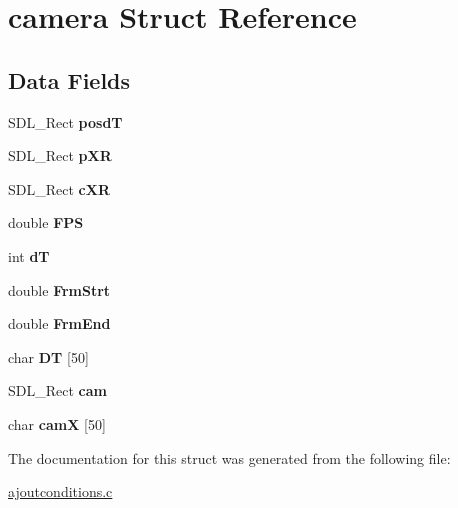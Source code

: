 \hypertarget{structcamera}{}\section{camera Struct Reference}
\label{structcamera}
\subsection*{Data Fields}
\begin{DoxyCompactItemize}
\item 
S\+D\+L\+\_\+\+Rect {\bfseries posdT}\hypertarget{structcamera_a009926b7b18bd483f27645f463f7463c}{}\label{structcamera_a009926b7b18bd483f27645f463f7463c}

\item 
S\+D\+L\+\_\+\+Rect {\bfseries p\+XR}\hypertarget{structcamera_ae3a1e769fbfe10ea4d1453c16c42e3ce}{}\label{structcamera_ae3a1e769fbfe10ea4d1453c16c42e3ce}

\item 
S\+D\+L\+\_\+\+Rect {\bfseries c\+XR}\hypertarget{structcamera_a134fe062710ef10c8aa37628c9fbe1f5}{}\label{structcamera_a134fe062710ef10c8aa37628c9fbe1f5}

\item 
double {\bfseries F\+PS}\hypertarget{structcamera_afea4555da34258956a5c18694a620d68}{}\label{structcamera_afea4555da34258956a5c18694a620d68}

\item 
int {\bfseries dT}\hypertarget{structcamera_a8b299ba58c00e93ad02d6bdbad871d9f}{}\label{structcamera_a8b299ba58c00e93ad02d6bdbad871d9f}

\item 
double {\bfseries Frm\+Strt}\hypertarget{structcamera_a62f48b9a8e4a2adb44fd95a80b4ff5d7}{}\label{structcamera_a62f48b9a8e4a2adb44fd95a80b4ff5d7}

\item 
double {\bfseries Frm\+End}\hypertarget{structcamera_a0689e8f79e69ab9bc91c1be2e4a66ea3}{}\label{structcamera_a0689e8f79e69ab9bc91c1be2e4a66ea3}

\item 
char {\bfseries DT} \mbox{[}50\mbox{]}\hypertarget{structcamera_a754156e5c7401a783f4a0e4a8917c1fd}{}\label{structcamera_a754156e5c7401a783f4a0e4a8917c1fd}

\item 
S\+D\+L\+\_\+\+Rect {\bfseries cam}\hypertarget{structcamera_a3edd8c2acc4df627823502ae4728355d}{}\label{structcamera_a3edd8c2acc4df627823502ae4728355d}

\item 
char {\bfseries camX} \mbox{[}50\mbox{]}\hypertarget{structcamera_a1bf016767b358b1d76be4ef77fb3d861}{}\label{structcamera_a1bf016767b358b1d76be4ef77fb3d861}

\end{DoxyCompactItemize}


The documentation for this struct was generated from the following file\+:\begin{DoxyCompactItemize}
\item 
\hyperlink{ajoutconditions_8c}{ajoutconditions.\+c}\end{DoxyCompactItemize}
